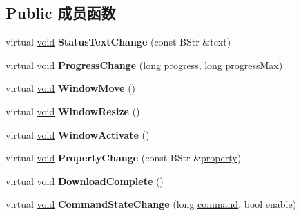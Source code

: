 \subsection*{Public 成员函数}
\begin{DoxyCompactItemize}
\item 
\mbox{\label{struct_d_web_browser_events2_i_f_aec36bd52aa6a4851d2b8c54f8131a553}} 
virtual \hyperlink{interfacevoid}{void} {\bfseries Status\+Text\+Change} (const B\+Str \&text)
\item 
\mbox{\label{struct_d_web_browser_events2_i_f_a2c8853fb171e91a3f515ccd9ce8c73ee}} 
virtual \hyperlink{interfacevoid}{void} {\bfseries Progress\+Change} (long progress, long progress\+Max)
\item 
\mbox{\label{struct_d_web_browser_events2_i_f_a097cddd617dca0a26100860737b68c6d}} 
virtual \hyperlink{interfacevoid}{void} {\bfseries Window\+Move} ()
\item 
\mbox{\label{struct_d_web_browser_events2_i_f_ab817bffdbaca3a058a4fed9eb4bde179}} 
virtual \hyperlink{interfacevoid}{void} {\bfseries Window\+Resize} ()
\item 
\mbox{\label{struct_d_web_browser_events2_i_f_a75b66d62f91a6998ebc841b12ffdbb11}} 
virtual \hyperlink{interfacevoid}{void} {\bfseries Window\+Activate} ()
\item 
\mbox{\label{struct_d_web_browser_events2_i_f_a5d81c775a7e6da75c6a7e22979104d2c}} 
virtual \hyperlink{interfacevoid}{void} {\bfseries Property\+Change} (const B\+Str \&\hyperlink{structproperty}{property})
\item 
\mbox{\label{struct_d_web_browser_events2_i_f_a8506c002787a602e0d6847fd183c2abe}} 
virtual \hyperlink{interfacevoid}{void} {\bfseries Download\+Complete} ()
\item 
\mbox{\label{struct_d_web_browser_events2_i_f_ab16e1b76e0070ec4e2ac5c5f8f68e7cd}} 
virtual \hyperlink{interfacevoid}{void} {\bfseries Command\+State\+Change} (long \hyperlink{structcommand}{command}, bool enable)

\end{DoxyCompactItemize}
